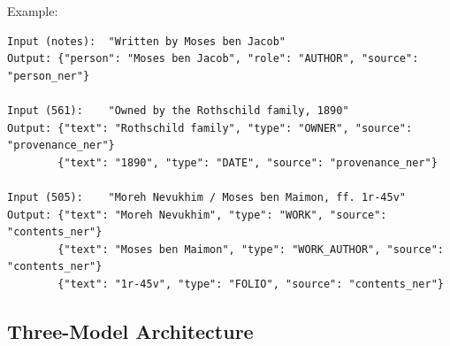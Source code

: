 \documentclass[12pt]{article}
\begin{document}
Example:
\begin{lstlisting}[basicstyle=\ttfamily\small, frame=none, backgroundcolor=\color{white}]
Input (notes):  "Written by Moses ben Jacob"
Output: {"person": "Moses ben Jacob", "role": "AUTHOR", "source": "person_ner"}

Input (561):    "Owned by the Rothschild family, 1890"
Output: {"text": "Rothschild family", "type": "OWNER", "source": "provenance_ner"}
        {"text": "1890", "type": "DATE", "source": "provenance_ner"}

Input (505):    "Moreh Nevukhim / Moses ben Maimon, ff. 1r-45v"
Output: {"text": "Moreh Nevukhim", "type": "WORK", "source": "contents_ner"}
        {"text": "Moses ben Maimon", "type": "WORK_AUTHOR", "source": "contents_ner"}
        {"text": "1r-45v", "type": "FOLIO", "source": "contents_ner"}
\end{lstlisting}

\subsection{Three-Model Architecture}
\end{document}
